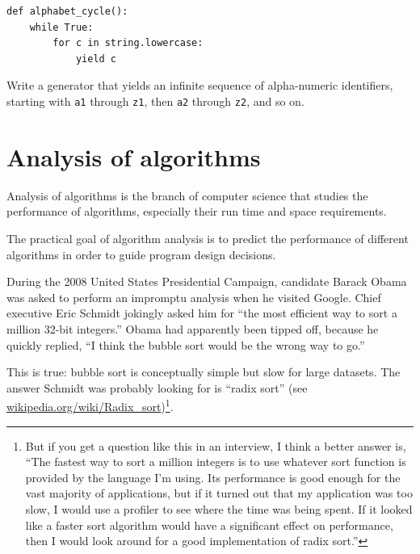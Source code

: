 \documentclass[10pt]{book}
\begin{document}
\begin{verbatim}
def alphabet_cycle():
    while True:
        for c in string.lowercase:
            yield c
\end{verbatim}


\begin{ex}

Write a generator that yields an infinite sequence of alpha-numeric
identifiers, starting with {\tt a1} through {\tt z1}, then {\tt a2}
through {\tt z2}, and so on.

\end{ex}


\chapter{Analysis of algorithms}

Analysis of algorithms is the branch of computer science that studies
the performance of algorithms, especially their run time and space
requirements.



The practical goal of algorithm analysis is to predict
the performance of different algorithms in order to guide 
program design decisions.

During the 2008 United States Presidential Campaign, candidate
Barack Obama was asked to perform an impromptu analysis when
he visited Google.  Chief executive Eric Schmidt jokingly asked him
for ``the most efficient way to sort a million 32-bit integers.''
Obama had apparently been tipped off, because he quickly
replied, ``I think the bubble sort would be the wrong way to go.''

This is true: bubble sort is conceptually simple but slow for
large datasets.  The answer Schmidt was probably looking for is
``radix sort'' (see \url{wikipedia.org/wiki/Radix_sort})\footnote{
But if you get a question like this in an interview, I think
a better answer is, ``The fastest way to sort a million integers
is to use whatever sort function is provided by the language
I'm using.  Its performance is good enough for the vast majority
of applications, but if it turned out that my application was too
slow, I would use a profiler to see where the time was being
spent.  If it looked like a faster sort algorithm would have
a significant effect on performance, then I would look
around for a good implementation of radix sort.''}.
\end{document}
